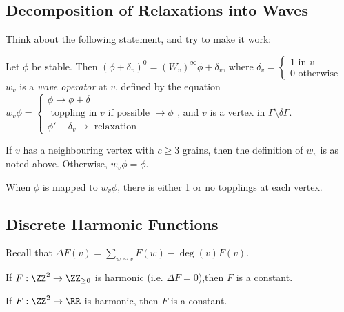 \documentclass[11pt]{scrartcl}
\begin{document}
  \subsection{Decomposition of Relaxations into Waves}
  Think about the following statement, and try to make it work:
  \begin{theorem}
  Let $\phi$ be stable. Then
  $(\phi + \delta_{v})^{0} = (W_{v})^{\infty}\phi + \delta_{v}$, where
  $\delta_{v} = \begin{cases}
    1 \text{ in } v\\
    0 \text{ otherwise }
  \end{cases}$ $w_{v}$ is a \textit{wave operator} at $v$, defined by
  the equation $w_{v}\phi = \begin{cases}
    \phi\to \phi + \delta\\
    \text{ toppling in } v \text{ if possible } \to \phi\\
    \phi' - \delta_{v} \to \text{ relaxation }
  \end{cases}$, and $v$ is a vertex in
  $\Gamma \setminus \delta\Gamma$.
  \end{theorem}

  \begin{note*}
    If $v$ has a neighbouring vertex with $c\geq 3$ grains, then the
    definition of $w_{v}$ is as noted above. Otherwise,
    $w_{v}\phi = \phi$.
  \end{note*}

  \begin{exercise}

    When $\phi$ is mapped to $w_{v}\phi$, there is either 1 or no
    topplings at each vertex.

  \end{exercise}

  \subsection{Discrete Harmonic Functions}

  Recall that $\Delta F(v) = \sum_{w\sim v} F(w) - \deg(v)F(v)$.

  \begin{exercise}

    If $F:\ZZ^{2} \to \ZZ_{\geq 0}$ is harmonic (i.e.
    $\Delta F = 0$),then $F$ is a constant.

  \end{exercise}

  \begin{exercise}

    If $F: \ZZ^{2} \to \RR$ is harmonic, then $F$ is a constant.

  \end{exercise}
\end{document}
